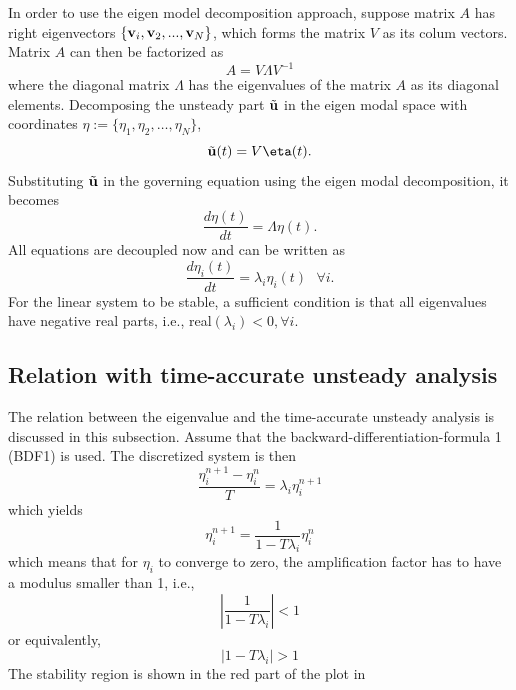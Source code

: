 \documentclass[journal,final]{new-aiaa}
\begin{document}
In order to use the eigen model decomposition approach, suppose
matrix $A$ has right eigenvectors $\{\mathbf{v}_i, \mathbf{v}_2, ..., \mathbf{v}_N\}$,
which forms the matrix $V$ as its colum vectors. Matrix $A$ can then
be factorized as 
\begin{equation*}
A=V\Lambda V^{-1}
\end{equation*}
where the diagonal matrix $\Lambda$ has the eigenvalues of the matrix $A$
as its diagonal elements.
Decomposing the unsteady part $\tilde {\mathbf{u}}$ in the eigen modal space with
coordinates $\eta:=\{\eta_1, \eta_2,\dots, \eta_N\}$,
\begin{equation*}
\tilde \uu(t) = V \eta(t).
\end{equation*}
Substituting $\tilde {\mathbf{u}}$ in the governing equation using the eigen modal
decomposition, it becomes
\begin{equation*}
\dfrac{d \eta(t)}{dt}= \Lambda \eta(t).
\end{equation*}
All equations are decoupled now and can be written as
\begin{equation*}
\dfrac{d \eta_i(t)}{dt}= \lambda_i \eta_i(t)  ~~~\forall i.
\end{equation*}
For the linear system to be stable, a sufficient condition is
that all eigenvalues have negative real parts, i.e., real$(\lambda_i)<0, \forall i$.


\subsection{Relation with time-accurate unsteady analysis}
The relation between the eigenvalue and the time-accurate
unsteady analysis is discussed in this subsection. Assume that
the backward-differentiation-formula 1 (BDF1) is used.
The discretized system is then
\begin{equation}\label{discretetime}
\dfrac{\eta^{n+1}_i-\eta^n_i}{T} = \lambda_i  \eta_i^{n+1}
\end{equation}
which yields
\begin{equation}\label{discretetime}
\eta^{n+1}_i   =\dfrac{1}{1-T \lambda_i}  \eta_i^n
\end{equation}
which means that for $\eta_i$ to converge to zero,
the amplification factor has to have a modulus smaller than 1, i.e.,
\begin{equation*}
\left |\dfrac{{1}}{1-T \lambda_i} \right  |<1
\end{equation*}
or equivalently,
\begin{equation*}
\left |1-T \lambda_i \right  |>1
\end{equation*}
The stability region is shown in the red part of the plot in 
\end{document}
